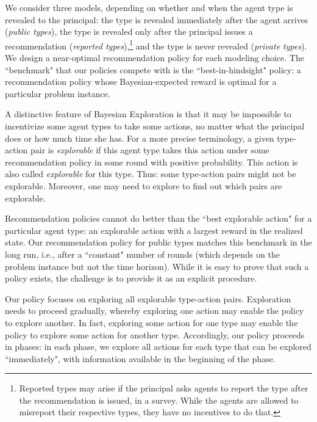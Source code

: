 We consider three models, depending on whether and when the agent type is revealed to the principal: the type is revealed immediately after the agent arrives (\emph{public types}), the type is revealed only after the principal issues a recommendation (\emph{reported types}),\footnote{Reported types may arise if
the principal asks agents to report the type after the recommendation is issued, \eg in a survey. While the agents are allowed to misreport their respective types, they have no incentives to do that.}
and the type is never revealed (\emph{private types}).
%
We design a near-optimal recommendation policy for each modeling choice. The ``benchmark" that our policies compete with is the ``best-in-hindsight"
policy: a recommendation policy whose Bayesian-expected reward is optimal for a particular problem instance.


A distinctive feature of Bayesian Exploration is that it may be impossible to incentivize some agent types to take some actions, no matter what the principal does or how much time she has. For a more precise terminology, a given type-action pair is \emph{explorable} if this agent type takes this action under some recommendation policy in some round with positive probability. This action is also called \emph{explorable} for this type. Thus: some type-action pairs might not be explorable. Moreover, one may need to explore to find out which pairs are explorable.

Recommendation policies cannot do better than the ``best explorable action" for a particular agent type: an explorable action with a largest reward in the realized state.  Our recommendation policy for public types matches this benchmark in the long run, i.e., after a ``constant" number of rounds (which depends on the problem instance but not the time horizon). While it is easy to prove that such a policy exists, the challenge is to provide it as an explicit procedure.

Our policy focuses on exploring all explorable type-action pairs. Exploration needs to proceed gradually, whereby exploring one action may enable the policy to explore another. In fact, exploring some action for one type may enable the policy to explore some action for another type. Accordingly, our policy proceeds in phases: in each phase, we explore all actions for each type that can be explored ``immediately", with information available in the beginning of the phase.


